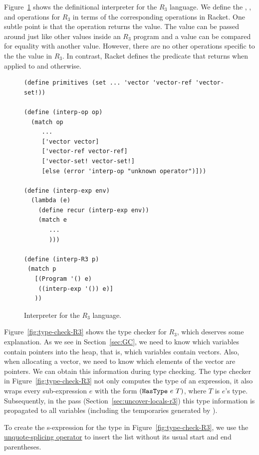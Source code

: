 \documentclass[11pt]{book}
\begin{document}
Figure~\ref{fig:interp-R3} shows the definitional interpreter for the
$R_3$ language. We define the , , and
 operations for $R_3$ in terms of the corresponding
operations in Racket. One subtle point is that the 
operation returns the  value. The  value
can be passed around just like other values inside an $R_3$ program
and a  value can be compared for equality with another
 value. However, there are no other operations specific
to the the  value in $R_3$. In contrast, Racket defines
the  predicate that returns  when applied to
 and  otherwise.

\begin{figure}[tbp]
\begin{lstlisting}
(define primitives (set ... 'vector 'vector-ref 'vector-set!))

(define (interp-op op)
  (match op
     ...
     ['vector vector]
     ['vector-ref vector-ref]
     ['vector-set! vector-set!]
     [else (error 'interp-op "unknown operator")]))

(define (interp-exp env)
  (lambda (e)
    (define recur (interp-exp env))
    (match e
       ...
       )))

(define (interp-R3 p)
 (match p
   [(Program '() e)
    ((interp-exp '()) e)]
   ))
\end{lstlisting}
\caption{Interpreter for the $R_3$ language.}
\label{fig:interp-R3}
\end{figure}

Figure~\ref{fig:type-check-R3} shows the type checker for $R_3$, which
deserves some explanation. As we see in Section~\ref{sec:GC}, we
need to know which variables contain pointers into the heap, that is,
which variables contain vectors. Also, when allocating a vector, we
need to know which elements of the vector are pointers. We can obtain
this information during type checking. The type checker in
Figure~\ref{fig:type-check-R3} not only computes the type of an
expression, it also wraps every sub-expression $e$ with the form
$(\texttt{HasType}~e~T)$, where $T$ is $e$'s type.
Subsequently, in the  pass
(Section~\ref{sec:uncover-locals-r3}) this type information is
propagated to all variables (including the temporaries generated by
).

To create the s-expression for the  type in
Figure~\ref{fig:type-check-R3}, we use the
\href{https://docs.racket-lang.org/reference/quasiquote.html}{unquote-splicing
  operator}  to insert the list  without its usual
start and end parentheses.  
\end{document}
